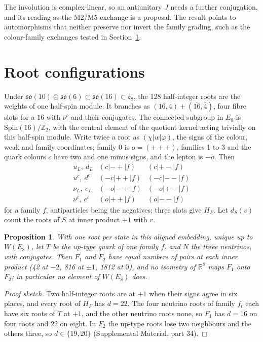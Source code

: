\documentclass[aps,prd,reprint,onecolumn,nofootinbib,amsmath,amssymb,floatfix]{revtex4-2}
\theoremstyle{plain}
\newtheorem{proposition}[theorem]{Proposition}
\newcommand{\R}{\mathbb R}
\newcommand{\supp}[1]{Supplemental Material, part #1}
\begin{document}
The involution is complex-linear, so an antiunitary $J$ needs a further conjugation, and its reading as the M2/M5 exchange is a proposal. The result points to automorphisms that neither preserve nor invert the family grading, such as the colour-family exchanges tested in Section~\ref{sec:roots}.

\section{Root configurations}\label{sec:roots}

Under $\mathfrak{so}(10)\oplus\mathfrak{so}(6)\subset\mathfrak{so}(16)\subset\mathfrak e_8$, the 128 half-integer roots are the weights of one half-spin module. It branches as $(16,4)+(\overline{16},\bar4)$, four fibre slots for a $16$ with $\nu^c$ and their conjugates. The connected subgroup in $E_8$ is $\mathrm{Spin}(16)/\mathbb Z_2$, with the central element of the quotient kernel acting trivially on this half-spin module. Write twice a root as $(\chi|w|\varphi)$, the signs of the colour, weak and family coordinates; family 0 is $o=(+{+}+)$, families 1 to 3 and the quark colours $c$ have two and one minus signs, and the lepton is $-o$. Then
\begin{equation}\label{eq:roots}
\begin{array}{lll}
u_L,\ d_L&(c|{-}{+}|f)&(c|{+}{-}|f)\\
u^c,\ d^c&(-c|{+}{+}|f)&(-c|{-}{-}|f)\\
\nu_L,\ e_L&(-o|{-}{+}|f)&(-o|{+}{-}|f)\\
\nu^c,\ e^c&(o|{+}{+}|f)&(o|{-}{-}|f)
\end{array}
\end{equation}
for a family $f$, antiparticles being the negatives; three slots give $H_F$. Let $d_S(v)$ count the roots of $S$ at inner product $+1$ with $v$.

\begin{proposition}\label{prop:iso}
With one root per state in this aligned embedding, unique up to $W(E_8)$, let $T$ be the up-type quark of one family $f_t$ and $N$ the three neutrinos, with conjugates. Then $F_1$ and $F_2$ have equal numbers of pairs at each inner product (42 at $-2$, 816 at $\pm1$, 1812 at $0$), and no isometry of $\R^8$ maps $F_1$ onto $F_2$; in particular no element of $W(E_8)$ does.
\end{proposition}

\begin{proof}[Proof sketch]
Two half-integer roots are at $+1$ when their signs agree in six places, and every root of $H_F$ has $d=22$. The four neutrino roots of family $f_t$ each have six roots of $T$ at $+1$, and the other neutrino roots none, so $F_1$ has $d=16$ on four roots and $22$ on eight. In $F_2$ the up-type roots lose two neighbours and the others three, so $d\in\{19,20\}$ (\supp{34}).
\end{proof}
\end{document}
